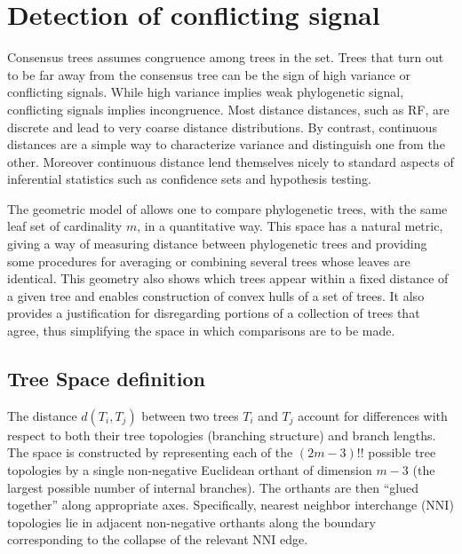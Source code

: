 \section{Detection of conflicting signal} \label{sec:extensions}

Consensus trees assumes congruence among trees in the set. Trees that turn out to be far away from the consensus tree can be the sign of high variance or conflicting signals. While high variance implies weak phylogenetic signal, conflicting  signals implies incongruence. Most distance distances, such as RF, are discrete and lead to very coarse distance distributions. By contrast, continuous distances are a simple way to characterize variance and distinguish one from the other. Moreover continuous distance lend themselves nicely to standard aspects of inferential statistics such as confidence sets and hypothesis testing.


The  geometric  model of \cite{Billera2001} allows one to compare phylogenetic  trees,  with  the  same  leaf  set  of  cardinality $m$, in a quantitative way.  This  space  has  a  natural  metric, giving a way of measuring distance between phylogenetic trees and providing some procedures for averaging or combining several trees whose leaves are identical. This geometry also shows which trees appear within a fixed distance of a given tree and enables construction of convex hulls of a
set of trees. It also provides a justification for disregarding portions of a collection of trees that agree,  thus simplifying the space in which comparisons are to be made.

\subsection{Tree Space definition} \label{sec:Tree-distances}
 The distance $d(T_i,T_j)$ between two trees $T_i$ and $T_j$ account for differences with respect to both their tree topologies (branching structure) and branch lengths. The space is constructed by representing each of the $(2m-3)!!$ possible tree topologies by a single non-negative Euclidean orthant of dimension $m-3$ (the largest possible number of internal branches). The orthants are then “glued together” along appropriate axes. Specifically, nearest neighbor interchange (NNI) topologies lie in adjacent non-negative orthants along the boundary corresponding to the collapse of the relevant NNI edge.

